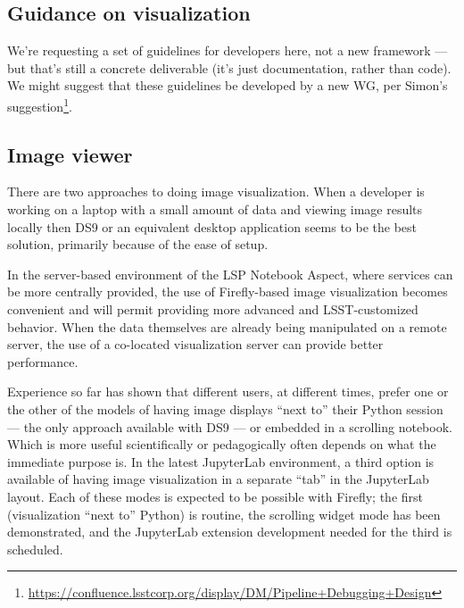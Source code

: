 \documentclass[DM,authoryear,toc,lsstdraft]{lsstdoc}
\begin{document}

\subsection{Guidance on visualization}


We're requesting a set of guidelines for developers here, not a new framework
--- but that's still a concrete deliverable (it's just documentation, rather
than code). We might suggest that these guidelines be developed by a new WG,
per Simon's
suggestion\footnote{\url{https://confluence.lsstcorp.org/display/DM/Pipeline+Debugging+Design}}.

\subsection{Image viewer}


There are two approaches to doing image visualization.
When a developer is working on a laptop with a
small amount of data and viewing image results locally then DS9 or an equivalent desktop application seems
to be the best solution, primarily because of the ease of setup.

In the server-based environment of the LSP Notebook Aspect, where services can be more centrally provided,
the use of Firefly-based image visualization becomes convenient and will permit providing more advanced
and LSST-customized behavior.
When the data themselves are already being manipulated on a remote server,
the use of a co-located visualization server can provide better performance.

Experience so far has shown that different users, at different times, prefer one or the other of the models of having image displays ``next to'' their Python session --- the only approach available with DS9 --- or embedded in a scrolling notebook.
Which is more useful scientifically or pedagogically often depends on what the immediate purpose is.
In the latest JupyterLab environment, a third option is available of having image visualization in a separate ``tab'' in the JupyterLab layout.
Each of these modes is expected to be possible with Firefly; the first (visualization ``next to'' Python) is routine,
the scrolling widget mode has been demonstrated, and the JupyterLab extension development needed for the third is scheduled.
\end{document}
